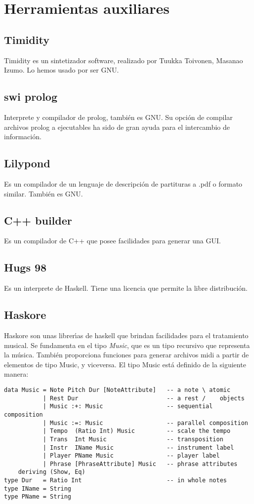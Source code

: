 \chapter{Herramientas auxiliares}
\section{Timidity}
Timidity es un sintetizador software, realizado por Tuukka Toivonen, Masanao Izumo. Lo hemos usado por ser GNU.

\section{swi prolog}
Interprete y compilador de prolog, tambi\'en es GNU. Su opci\'on de compilar archivos prolog a ejecutables ha sido de gran ayuda para el intercambio de informaci\'on.

\section{Lilypond}
Es un compilador de un lenguaje de descripci\'on de partituras a .pdf o formato similar. Tambi\'en es GNU.

\section{C++ builder}
Es un compilador de C++ que posee facilidades para generar una GUI.

\section{Hugs 98}
Es un interprete de Haskell. Tiene una licencia que permite la libre distribuci\'on.

\section{Haskore}
Haskore son unas librer\'\i as de haskell que brindan facilidades para el tratamiento musical. Se fundamenta en el tipo \emph{Music}, que es un tipo recursivo que representa la m\'usica. Tambi\'en proporciona funciones para generar archivos midi a partir de elementos de tipo Music, y viceversa. El tipo Music est\'a definido de la siguiente manera:
\begin{verbatim}
data Music = Note Pitch Dur [NoteAttribute]   -- a note \ atomic 
           | Rest Dur                         -- a rest /    objects
           | Music :+: Music                  -- sequential composition
           | Music :=: Music                  -- parallel composition
           | Tempo  (Ratio Int) Music         -- scale the tempo
           | Trans  Int Music                 -- transposition
           | Instr  IName Music               -- instrument label
           | Player PName Music               -- player label
           | Phrase [PhraseAttribute] Music   -- phrase attributes
    deriving (Show, Eq)
type Dur   = Ratio Int                        -- in whole notes
type IName = String
type PName = String
\end{verbatim}

